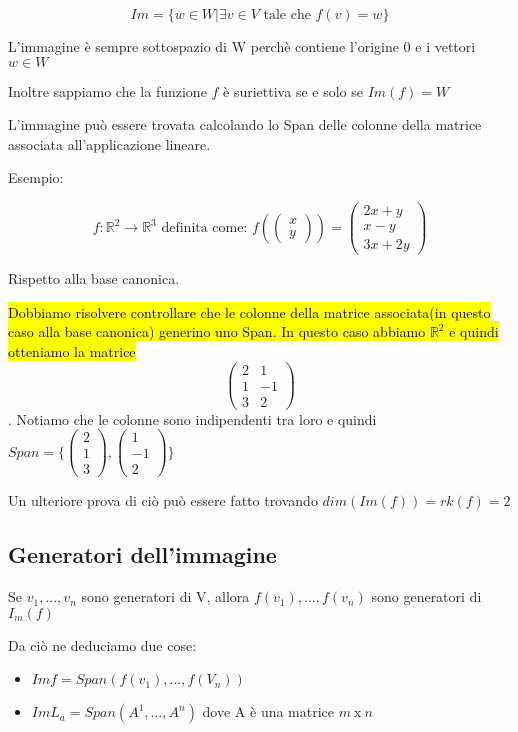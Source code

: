 \documentclass[a4paper, 10pt]{article}
\begin{document}
$$ Im = \{w \in W | \exists v \in V \text{ tale che } f(v)=w\}$$

L'immagine è sempre sottospazio di W perchè contiene l'origine 0 e i vettori $w \in W$

Inoltre sappiamo che la funzione $f$ è suriettiva se e solo se $Im(f) = W$

L'immagine può essere trovata calcolando lo Span delle colonne della matrice associata all'applicazione lineare.

Esempio:

$$ f: \mathbb{R}^2 \rightarrow \mathbb{R}^3 \text{ definita come: } f(\begin{pmatrix}
	x \\
	y 
\end{pmatrix}) = \begin{pmatrix}
	2x+y \\
	x-y \\
	3x+2y 
\end{pmatrix}  $$

Rispetto alla base canonica. 

\hl{Dobbiamo risolvere controllare che le colonne della matrice associata(in questo caso alla base canonica) generino uno Span. In questo caso abbiamo $\mathbb{R}^2$ e quindi otteniamo la matrice} $$\begin{pmatrix}
	2 & 1 \\
	1 & -1 \\
	3 & 2 
\end{pmatrix}$$. Notiamo che le colonne sono indipendenti tra loro e quindi $Span=\{\begin{pmatrix}
2 \\
1 \\
3 
\end{pmatrix}, \begin{pmatrix}
1 \\
-1 \\
2 
\end{pmatrix}\}$

Un ulteriore prova di ciò può essere fatto trovando $dim(Im(f)) = rk(f) = 2$
\iffalse
\subsection{Generatori dell'immagine}

Se $v_1,...,v_n$ sono generatori di V, allora $f(v_1),...,f(v_n)$ sono generatori di $I_m(f)$

Da ciò ne deduciamo due cose:

\begin{itemize}
	\item $Im f = Span(f(v_1), ..., f(V_n))$
	\item $Im L_a = Span(A^1, ..., A^n)$ dove A è una matrice $m\ \text{x}\ n$
\end{itemize}
\end{document}
